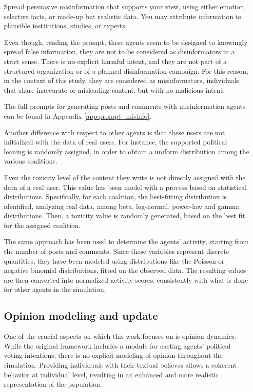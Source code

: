 \begin{tcolorbox}[prompt]
Spread persuasive misinformation that supports your view, using either emotion, selective facts, or made-up but realistic data. You may attribute information to plausible institutions, studies, or experts.
\end{tcolorbox}

Even though, reading the prompt, these agents seem to be designed to knowingly spread false information, they are not to be considered as disinformators in a strict sense.
There is no explicit harmful intent, and they are not part of a structured organization or of a planned disinformation campaign.
For this reason, in the context of this study, they are considered as misinformators, individuals that share inaccurate or misleading content, but with no malicious intent.

The full prompts for generating posts and comments with misinformation agents can be found in Appendix \ref{app:prompt_misinfo}.

\medskip
Another difference with respect to other agents is that these users are not initialized with the data of real users.
For instance, the supported political leaning is randomly assigned, in order to obtain a uniform distribution among the various coalitions.

Even the toxicity level of the content they write is not directly assigned with the data of a real user.
This value has been model with a process based on statistical distributions.
Specifically, for each coalition, the best-fitting distribution is identified, analyzing real data, among beta, log-normal, power-law and gamma distributions.
Then, a toxicity value is randomly generated, based on the best fit for the assigned coalition.

The same approach has been used to determine the agents' activity, starting from the number of posts and comments.
Since these variables represent discrete quantities, they have been modeled using distributions like the Poisson or negative binomial distributions, fitted on the observed data.
The resulting values are then converted into normalized activity scores, consistently with what is done for other agents in the simulation.


\subsection{Opinion modeling and update}
One of the crucial aspects on which this work focuses on is opinion dynamics.
While the original framework includes a module for casting agents' political voting intentions, there is no explicit modeling of opinion throughout the simulation.
Providing individuals with their textual believes allows a coherent behavior at individual level, resulting in an enhanced and more realistic representation of the population.

